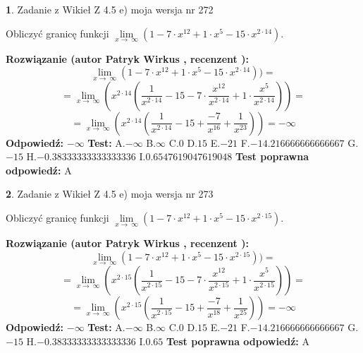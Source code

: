 \documentclass[12pt, a4paper]{article}
\theoremstyle{definition} %
\newtheorem{zad}{}
\newcommand{\zadStart}[1]{\begin{zad}#1\newline}
\newcommand{\zadStop}{\end{zad}}
\newcommand{\rozwStart}[2]{\noindent \textbf{Rozwiązanie (autor #1 , recenzent #2): }\newline}
\newcommand{\rozwStop}{\newline}
\newcommand{\odpStart}{\noindent \textbf{Odpowiedź:}\newline}
\newcommand{\odpStop}{\newline}
\newcommand{\testStart}{\noindent \textbf{Test:}\newline}
\newcommand{\testStop}{\newline}
\newcommand{\kluczStart}{\noindent \textbf{Test poprawna odpowiedź:}\newline}
\newcommand{\kluczStop}{\newline}
\begin{document}
\zadStart{Zadanie z Wikieł Z 4.5 e) moja wersja nr 272}


Obliczyć granicę funkcji  $\lim\limits_{x\to\ \infty}(1 - 7 \cdot x^{12}+1 \cdot x^{5}- 15 \cdot x^{2\cdot14})$.
\zadStop
\rozwStart{Patryk Wirkus}{}
$$\lim\limits_{x\to\ \infty}(1 - 7 \cdot x^{12}+1 \cdot x^{5}- 15 \cdot x^{2\cdot14}))=$$
$$=\lim\limits_{x\to\ \infty}(x^{2\cdot14}(\frac{1}{x^{2\cdot14}}-15 -7 \cdot \frac{x^{12}}{x^{2\cdot14}}+1 \cdot \frac{x^{5}}{x^{2\cdot14}}))=$$
$$=\lim\limits_{x\to\ \infty}(x^{2\cdot14}(\frac{1}{x^{2\cdot14}}-15 + \frac{-7}{x^{16}}+ \frac{1}{x^{23}}))=-\infty$$
\rozwStop
\odpStart
$-\infty$
\odpStop
\testStart
A.$-\infty$ B.$\infty$ C.$0$ D.$15$ E.$-21$
F.$-14.216666666666667$ G.$-15$
H.$-0.38333333333333336$
I.$0.6547619047619048$
\testStop
\kluczStart
A
\kluczStop



\zadStart{Zadanie z Wikieł Z 4.5 e) moja wersja nr 273}


Obliczyć granicę funkcji  $\lim\limits_{x\to\ \infty}(1 - 7 \cdot x^{12}+1 \cdot x^{5}- 15 \cdot x^{2\cdot15})$.
\zadStop
\rozwStart{Patryk Wirkus}{}
$$\lim\limits_{x\to\ \infty}(1 - 7 \cdot x^{12}+1 \cdot x^{5}- 15 \cdot x^{2\cdot15}))=$$
$$=\lim\limits_{x\to\ \infty}(x^{2\cdot15}(\frac{1}{x^{2\cdot15}}-15 -7 \cdot \frac{x^{12}}{x^{2\cdot15}}+1 \cdot \frac{x^{5}}{x^{2\cdot15}}))=$$
$$=\lim\limits_{x\to\ \infty}(x^{2\cdot15}(\frac{1}{x^{2\cdot15}}-15 + \frac{-7}{x^{18}}+ \frac{1}{x^{25}}))=-\infty$$
\rozwStop
\odpStart
$-\infty$
\odpStop
\testStart
A.$-\infty$ B.$\infty$ C.$0$ D.$15$ E.$-21$
F.$-14.216666666666667$ G.$-15$
H.$-0.38333333333333336$
I.$0.65$
\testStop
\kluczStart
A
\kluczStop
\end{document}
